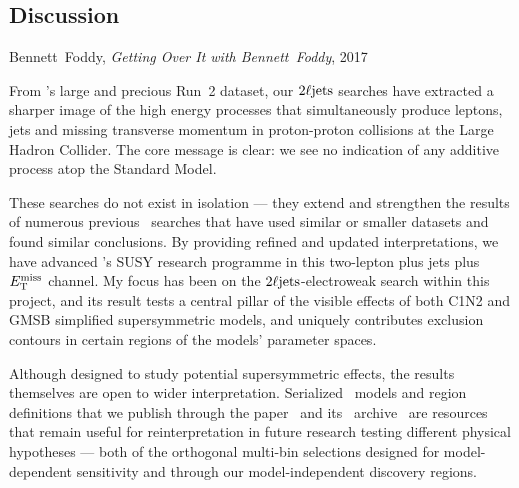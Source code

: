 \begin{singlespacing}
\section{Discussion}
\label{sec:2ljets_discussion}
\begin{epigraphs}
%
{Bennett~Foddy,
\emph{Getting Over It with Bennett~Foddy},
2017~\cite{foddy2017getting}}
\end{epigraphs}
\end{singlespacing}
\noindent
From \atlas's large and precious Run~2 dataset, our $2\ell\mathrm{jets}$ searches
have extracted a sharper image of the high energy processes that simultaneously
produce leptons, jets and missing transverse momentum in proton-proton
collisions at the Large Hadron Collider.
The core message is clear: we see no indication of any additive process
atop the Standard Model.

These searches do not exist in isolation --- they extend and strengthen the
results of numerous previous \atlas\ searches that have used similar or smaller
datasets and found similar conclusions.
By providing refined and updated interpretations, we have advanced \atlas's
SUSY research programme in this two-lepton plus jets plus $E_\mathrm{T}^\mathrm{miss}$ channel.
My focus has been on the $2\ell\mathrm{jets}$-electroweak search within this project,
and its result tests a central pillar of the visible effects of both C1N2 and
GMSB simplified supersymmetric models, and uniquely contributes exclusion
contours in certain regions of the models' parameter spaces.

Although designed to study potential supersymmetric effects, the results
themselves are open to wider interpretation.
Serialized \heplikelihood\ models and region definitions that we publish
through the paper~\cite{atlas2022searches} and its \hepdata\
archive~\cite{hepdata.116034} are resources that remain useful for
reinterpretation in future research testing different physical hypotheses
--- both of the orthogonal multi-bin selections designed for model-dependent
sensitivity and through our model-independent discovery regions.


